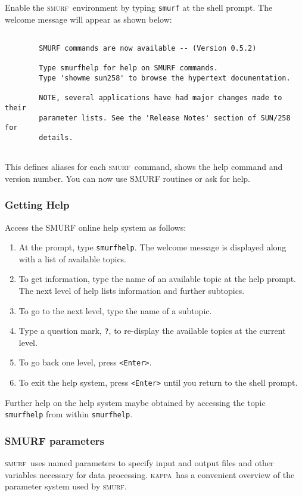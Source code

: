 \documentclass[twoside,11pt]{article}
\newcommand{\xref}[3]{#1}
\renewcommand{\_}{\texttt{\symbol{95}}}
\newcommand{\KAPPA}{\textsc{kappa}}
\newcommand{\KAPPAref}{\xref{\KAPPA}{sun95}{}}
\newcommand{\SMURF}{\textsc{smurf}}
\begin{document}
Enable the \SMURF\ environment by typing \verb+smurf+ at the shell
prompt. The welcome message will appear as shown below:
\begin{verbatim}

        SMURF commands are now available -- (Version 0.5.2)

        Type smurfhelp for help on SMURF commands.
        Type 'showme sun258' to browse the hypertext documentation.

        NOTE, several applications have had major changes made to their
        parameter lists. See the 'Release Notes' section of SUN/258 for
        details.


\end{verbatim}
This defines aliases for each \SMURF\ command, shows the help command
and version number. You can now use SMURF routines or ask for help.

\subsubsection{Getting Help}

Access the SMURF online help system as follows:
\begin{enumerate}
\item At the prompt, type \verb+smurfhelp+. The welcome message is
  displayed along with a list of available topics.
\item To get information, type the name of an available topic at the
  help prompt.  The next level of help lists information and further
  subtopics.
\item To go to the next level, type the name of a subtopic.
\item Type a question mark, \verb+?+, to re-display the available
  topics at the current level.
\item To go back one level, press \verb+<Enter>+.
\item To exit the help system, press \verb+<Enter>+ until you return
  to the shell prompt.
\end{enumerate}
Further help on the help system maybe obtained by accessing the topic
\verb+smurfhelp+ from within \verb+smurfhelp+.

\subsubsection{SMURF parameters}

\SMURF\ uses named parameters to specify input and output files and
other variables necessary for data processing. \KAPPAref\ has a
convenient overview of the parameter system used by \SMURF.
\end{document}
